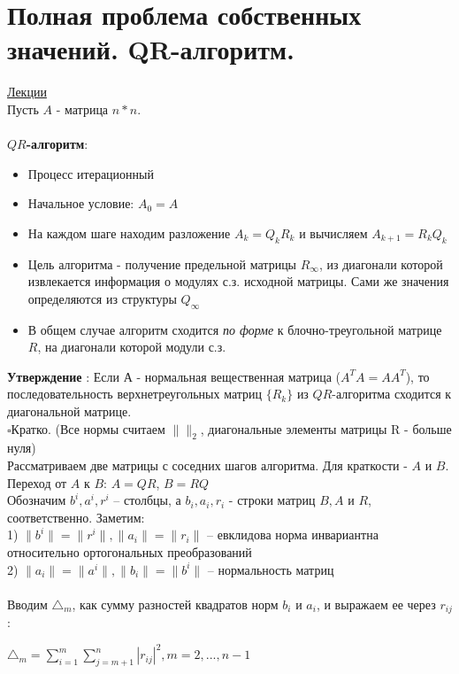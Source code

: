 \documentclass[specialist, subf, href, colorlinks=true, 12pt, times, mtpro, final]{disser}
\theoremstyle{definition}
\begin{document}
	

\section {Полная проблема собственных значений. QR-алгоритм.}
	\hyperlink {lects.79}{Лекции}\\
	
Пусть $A$ - матрица $n*n$.
\\
\\
\textbf{$QR$-алгоритм}:
\begin{itemize}
\item Процесс итерационный
\item Начальное условие: $A_0 = A$
\item На каждом шаге находим разложение $A_k = Q_kR_k$ и  вычисляем $A_{k+1} = R_k Q_k $
\item Цель алгоритма - получение предельной матрицы $R_{\infty}$, из диагонали которой извлекается информация о  модулях с.з. исходной матрицы. Сами же значения определяются из структуры $Q_{\infty}$

\item В общем случае алгоритм сходится \textit{по форме} к блочно-треугольной матрице $R$, на диагонали которой модули с.з.
\end{itemize}
\textbf{Утверждение }:
Если $А$ - нормальная вещественная матрица ($A^TA = AA^T$), то последовательность верхнетреугольных матриц $\{R_k\}$ из $QR$-алгоритма сходится к диагональной матрице.
\\
$\square$Кратко. (Все нормы считаем $\|\|_2$, диагональные элементы матрицы R - больше нуля)\\

Рассматриваем две матрицы с соседних шагов алгоритма. Для краткости - $A$ и $B$. \\
Переход от $A$ к $B$: $A = QR$, $B = RQ$\\

Обозначим $b^i, a^i, r^i$ \--- столбцы, а $b_i, a_i, r_i$ - строки матриц $B, A$ и $R$, соответственно. 
Заметим:\\
1) $\|b^i\| = \|r^i\|, \|a_i\| = \|r_i\|$ \--- евклидова норма инвариантна относительно ортогональных преобразований\\
2) $\|a_i\| = \|a^i\|, \|b_i\| = \|b^i\|$ \--- нормальность матриц\\
\\
Вводим $\triangle_m$, как сумму разностей квадратов норм $b_i$ и $a_i$, и выражаем ее через $r_{ij}$:
\begin{center}
$\triangle_m = \sum\limits^m_{i=1} \sum\limits^n_{j=m+1} |r_{ij}|^2, m =2, ... , n-1$
\end{center}
\end{document}
